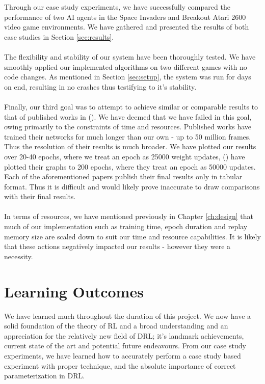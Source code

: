Through our case study experiments, we have successfully compared the performance of two AI agents in the Space Invaders and Breakout Atari 2600 video game environments. We have gathered and presented the results of both case studies in Section \ref{sec:results}. \paragraph{}

The flexibility and stability of our system have been thoroughly tested. We have smoothly applied our implemented algorithms on two different games with no code changes. As mentioned in Section \ref{sec:setup}, the system was run for days on end, resulting in no crashes thus testifying to it's stability. \paragraph{}

Finally, our third goal was to attempt to achieve similar or comparable results to that of published works in (\citet{human,doubleq,dueling}). We have deemed that we have failed in this goal, owing primarily to the constraints of time and resources. Published works have trained their networks for much longer than our own - up to 50 million frames. Thus the resolution of their results is much broader. We have plotted our results over 20-40 epochs, where we treat an epoch as 25000 weight updates, (\citet{human}) have plotted their graphs to 200 epochs, where they treat an epoch as 50000 updates. Each of the aforementioned papers publish their final results only in tabular format. Thus it is difficult and would likely prove inaccurate to draw comparisons with their final results. \paragraph{}

In terms of resources, we have mentioned previously in Chapter \ref{ch:design} that much of our implementation such as training time, epoch duration and replay memory size are scaled down to suit our time and resource capabilities. It is likely that these actions negatively impacted our results - however they were a necessity.

\section{Learning Outcomes}
We have learned much throughout the duration of this project. We now have a solid foundation of the theory of RL and a broad understanding and an appreciation for the relatively new field of DRL; it's landmark achievements, current state of the art and potential future endeavours. From our case study experiments, we have learned how to accurately perform a case study based experiment with proper technique, and the absolute importance of correct parameterization in DRL.

